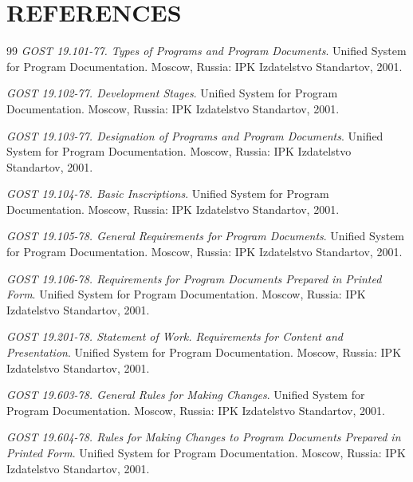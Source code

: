 \documentclass[12pt,a4paper]{extarticle}
\begin{document}
\section*{REFERENCES}

\renewcommand{\refname}{}
\begin{thebibliography}{99}
\emph{GOST 19.101-77. Types of Programs and Program Documents}. Unified System for Program Documentation. Moscow, Russia: IPK Izdatelstvo Standartov, 2001.

\emph{GOST 19.102-77. Development Stages}. Unified System for Program Documentation. Moscow, Russia: IPK Izdatelstvo Standartov, 2001.

\emph{GOST 19.103-77. Designation of Programs and Program Documents}. Unified System for Program Documentation. Moscow, Russia: IPK Izdatelstvo Standartov, 2001.

\emph{GOST 19.104-78. Basic Inscriptions}. Unified System for Program Documentation. Moscow, Russia: IPK Izdatelstvo Standartov, 2001.

\emph{GOST 19.105-78. General Requirements for Program Documents}. Unified System for Program Documentation. Moscow, Russia: IPK Izdatelstvo Standartov, 2001.

\emph{GOST 19.106-78. Requirements for Program Documents Prepared in Printed Form}. Unified System for Program Documentation. Moscow, Russia: IPK Izdatelstvo Standartov, 2001.

\emph{GOST 19.201-78. Statement of Work. Requirements for Content and Presentation}. Unified System for Program Documentation. Moscow, Russia: IPK Izdatelstvo Standartov, 2001.

\emph{GOST 19.603-78. General Rules for Making Changes}. Unified System for Program Documentation. Moscow, Russia: IPK Izdatelstvo Standartov, 2001.

\emph{GOST 19.604-78. Rules for Making Changes to Program Documents Prepared in Printed Form}. Unified System for Program Documentation. Moscow, Russia: IPK Izdatelstvo Standartov, 2001.
\end{thebibliography}
\end{document}
